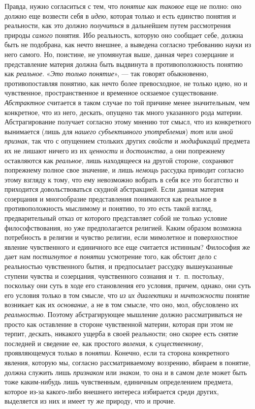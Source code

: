 \documentclass[twoside]{article}
\begin{document}
{{Правда, нужно согласиться с тем, что
{\em понятие как таковое}
еще не полно: оно должно еще возвести себя в
{\em идею}, которая
только и есть единство понятия и реальности, как это должно
{\em получиться} в
дальнейшем путем рассмотрения природы
{\em самого} понятия. Ибо
реальность, которую оно сообщает себе, должна быть не подобрана, как нечто
внешнее, а выведена согласно требованию науки из него самого. Но, поистине,
не упомянутая выше, данная через созерцание и представление материя должна
быть выдвинута в противоположность понятию как
{\em реальное}.
«{\em Это только понятие}», —
так говорят обыкновенно, противопоставляя понятию, как нечто
более превосходное, не только идею, но и чувственное, пространственное и
временное осязаемое существование.
{\em Абстрактное}
считается в таком случае по той причине менее значительным,
чем конкретное, что из него, дескать, опущено так много указанного рода
материи. Абстрагирование получает согласно этому мнению тот смысл, что из
конкретного вынимается (лишь для
{\em нашего субъективного
употребления}) {\em тот}
или {\em иной признак},
так что с опущением стольких других
{\em свойств} и
{\em модификаций}
предмета их не лишают ничего из их
{\em ценности} и
{\em достоинства}, а они
попрежнему оставляются как
{\em реальное}, лишь
находящееся на другой стороне, сохраняют попрежнему полное свое значение, и
лишь {\em немощь}
рассудка приводит согласно этому взгляду к тому, что ему
невозможно вобрать в себя все это богатство и приходится довольствоваться
скудной абстракцией. Если данная материя созерцания и многообразие
представления понимаются как реальное в противоположность мыслимому и
понятию, то это есть такой взгляд, предварительный отказ от которого
представляет собой не только условие философствования, но уже
предполагается религией. Каким образом возможна потребность в религии и
чувство религии, если мимолетное и поверхностное явление чувственного и
единичного все еще считается истинным? Философия же дает нам
{\em постигнутое в понятии}
усмотрение того, как обстоит дело с реальностью чувственного
бытия, и предпосылает рассудку вышеуказанные ступени чувства и созерцания,
чувственного сознания и~т.~п. постольку, поскольку они суть
в ходе его становления его условия, причем, однако, они суть его условия
только в том смысле, что {\em из их
диалектики} и
{\em ничтожности} понятие
возникает как их {\em основание},
а не в том смысле, что оно, мол, обусловлено их
{\em реальностью}.
Поэтому абстрагирующее мышление должно рассматриваться не
просто как оставление в стороне чувственной материи, которая при этом не
терпит, дескать, никакого ущерба в своей реальности; оно скорее есть снятие
последней и сведение ее, как простого
{\em явления}, к
{\em существенному},
проявляющемуся только в
{\em понятии}. Конечно,
если та сторона конкретного явления, которую мы, согласно рассматриваемому
воззрению, вбираем в понятие, должна служить лишь
{\em признаком} или
{\em знаком}, то она и в
самом деле может быть тоже каким-нибудь лишь чувственным, единичным
определением предмета, которое из-за какого-либо внешнего интереса
избирается среди других, выделяется из них и имеет ту же природу, что и
прочие.

}}
\end{document}
